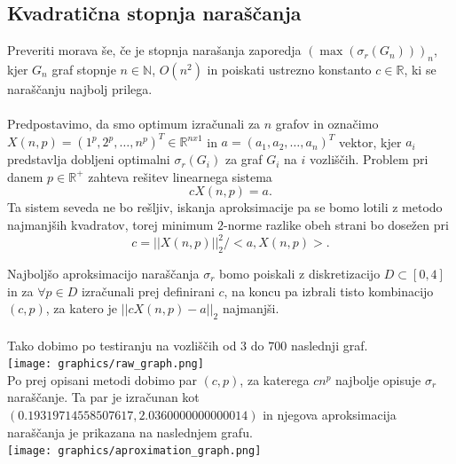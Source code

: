 \documentclass[ letterpaper, titlepage, fleqn]{article}
\begin{document}
\subsection{Kvadratična stopnja naraščanja}
Preveriti morava še, če je stopnja narašanja zaporedja
$(\max(\sigma_r(G_n)))_n$, kjer $G_n$ graf stopnje $n \in \mathbb{N}$,
$O(n^2)$ in poiskati ustrezno konstanto $c \in \mathbb{R}$, ki 
se naraščanju najbolj prilega.
\\\\
Predpostavimo, da smo optimum izračunali za $n$ grafov in
označimo $X(n, p) = (1^p, 2^p, \dots, n^p)^T \in \mathbb{R}^{nx1}$ 
in $a = (a_1, a_2, \dots, a_n)^T$ vektor, kjer $a_i$ predstavlja
dobljeni optimalni $\sigma_r(G_i)$ za graf $G_i$ na $i$ vozliščih.
Problem pri danem $p \in \mathbb{R}^{+}$ zahteva rešitev linearnega sistema 
$$cX(n, p) = a.$$
Ta sistem seveda ne bo rešljiv, iskanja aproksimacije pa se bomo
lotili z metodo najmanjših kvadratov, torej minimum $2$-norme
razlike obeh strani bo dosežen pri
$$c = ||X(n, p)||_{2}^2 / <a, X(n, p)>.$$

Najboljšo aproksimacijo naraščanja $\sigma_r$ bomo poiskali 
z diskretizacijo $D \subset [0, 4]$ in za $\forall p \in D$ 
izračunali prej definirani $c$, na koncu pa izbrali tisto kombinacijo
$(c, p)$, za katero je $||cX(n, p) - a||_{2}$ najmanjši.
\\\\
Tako dobimo po testiranju na vozliščih od $3$ do $700$ naslednji graf.\\
\texttt{[image: graphics/raw\_graph.png]} \\
Po prej opisani metodi dobimo par $(c, p)$, za katerega $cn^p$ najbolje opisuje
$\sigma_r$ naraščanje. Ta par je izračunan kot $(0.19319714558507617, 2.0360000000000014)$ in
njegova aproksimacija naraščanja je prikazana na naslednjem grafu.\\
\texttt{[image: graphics/aproximation\_graph.png]}\\
\end{document}
